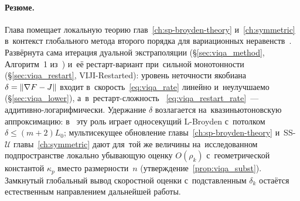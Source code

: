 \paragraph{Резюме.}\label{par:viqa-summary}
Глава помещает локальную теорию глав~\ref{ch:sp-broyden-theory}
и~\ref{ch:symmetric} в~контекст глобального метода второго порядка для
вариационных неравенств~\cite{viqa2024}. Развёрнута сама итерация дуальной
экстраполяции (\S\ref{sec:viqa_method}, Алгоритм~1 из~\cite{viqa2024})
и~её рестарт-вариант при~сильной монотонности
(\S\ref{sec:viqa_restart}, VIJI-Restarted): уровень неточности якобиана
$\delta=\left\|\nabla F - J\right\|$ входит в~скорость~\eqref{eq:viqa_rate}
линейно и~неулучшаемо (\S\ref{sec:viqa_lower}), а~в~рестарт-сложность
~\eqref{eq:viqa_restart_rate}~--- аддитивно-логарифмически. Удержание
$\delta$ возлагается на~квазиньютоновскую аппроксимацию: в~\cite{viqa2024}
эту роль играет односекущий L-Broyden с~потолком $\delta\le(m{+}2)L_0$;
мультисекущее обновление главы~\ref{ch:sp-broyden-theory} и~SS-$\mathcal{U}$
главы~\ref{ch:symmetric} дают для~той же величины на~исследованном
подпространстве локально убывающую оценку $O(\rho_k)$ с~геометрической
константой $\kappa_p$ вместо размерности~$n$
(утверждение~\ref{prop:viqa_subst}). Замкнутый глобальный вывод скоростной
оценки с~подставленным $\delta_k$ остаётся естественным направлением
дальнейшей работы.